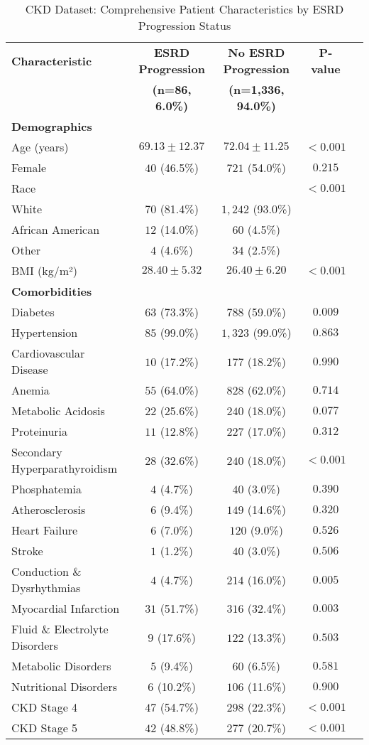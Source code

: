 \documentclass[letterpaper]{article}
\begin{document}
\begin{table}[htbp]
\centering
\caption{CKD Dataset: Comprehensive Patient Characteristics by ESRD Progression Status}
\label{tab:ckd_comprehensive}
\small
\begin{tabular}{@{}lcccc@{}}
\toprule
\textbf{Characteristic} & \textbf{ESRD Progression} & \textbf{No ESRD Progression} & \textbf{P-value} \\
 & \textbf{(n=86, 6.0\%)} & \textbf{(n=1,336, 94.0\%)} & \\
\midrule
\multicolumn{4}{l}{\textbf{Demographics}} \\
Age (years) & $69.13 \pm 12.37$ & $72.04 \pm 11.25$ & $<0.001$ \\
Female & $40$ (46.5\%) & $721$ (54.0\%) & $0.215$ \\
Race & & & $<0.001$ \\
\quad White & $70$ (81.4\%) & $1,242$ (93.0\%) & \\
\quad African American & $12$ (14.0\%) & $60$ (4.5\%) & \\
\quad Other & $4$ (4.6\%) & $34$ (2.5\%) & \\
BMI (kg/m²) & $28.40 \pm 5.32$ & $26.40 \pm 6.20$ & $<0.001$ \\
\midrule
\multicolumn{4}{l}{\textbf{Comorbidities}} \\
Diabetes & $63$ (73.3\%) & $788$ (59.0\%) & $0.009$ \\
Hypertension & $85$ (99.0\%) & $1,323$ (99.0\%) & $0.863$ \\
Cardiovascular Disease & $10$ (17.2\%) & $177$ (18.2\%) & $0.990$ \\
Anemia & $55$ (64.0\%) & $828$ (62.0\%) & $0.714$ \\
Metabolic Acidosis & $22$ (25.6\%) & $240$ (18.0\%) & $0.077$ \\
Proteinuria & $11$ (12.8\%) & $227$ (17.0\%) & $0.312$ \\
Secondary Hyperparathyroidism & $28$ (32.6\%) & $240$ (18.0\%) & $<0.001$ \\
Phosphatemia & $4$ (4.7\%) & $40$ (3.0\%) & $0.390$ \\
Atherosclerosis & $6$ (9.4\%) & $149$ (14.6\%) & $0.320$ \\
Heart Failure & $6$ (7.0\%) & $120$ (9.0\%) & $0.526$ \\
Stroke & $1$ (1.2\%) & $40$ (3.0\%) & $0.506$ \\
Conduction \& Dysrhythmias & $4$ (4.7\%) & $214$ (16.0\%) & $0.005$ \\
Myocardial Infarction & $31$ (51.7\%) & $316$ (32.4\%) & $0.003$ \\
Fluid \& Electrolyte Disorders & $9$ (17.6\%) & $122$ (13.3\%) & $0.503$ \\
Metabolic Disorders & $5$ (9.4\%) & $60$ (6.5\%) & $0.581$ \\
Nutritional Disorders & $6$ (10.2\%) & $106$ (11.6\%) & $0.900$ \\
CKD Stage 4 & $47$ (54.7\%) & $298$ (22.3\%) & $<0.001$ \\
CKD Stage 5 & $42$ (48.8\%) & $277$ (20.7\%) & $<0.001$ \\
\bottomrule
\end{tabular}
\end{table}
\end{document}
